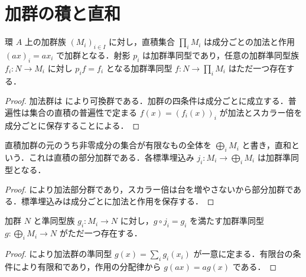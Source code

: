 \section{加群の積と直和}
\begin{prop}[加群の直積]
環 $A$ 上の加群族 $(M_i)_{i\in I}$ に対し，直積集合 $\prod_iM_i$ は成分ごとの加法と作用 $(ax)_i=ax_i$ で加群となる．射影 $p_i$ は加群準同型であり，任意の加群準同型族 $f_i:N\to M_i$ に対し $p_i f=f_i$ となる加群準同型 $f:N\to\prod_iM_i$ はただ一つ存在する．
\end{prop}
\begin{proof}
加法群は  により可換群である．加群の四条件は成分ごとに成立する．普遍性は集合の直積の普遍性で定まる $f(x)=(f_i(x))_i$ が加法とスカラー倍を成分ごとに保存することによる．
\end{proof}
\begin{defn}[加群の直和]
直積加群の元のうち非零成分の集合が有限なもの全体を $\bigoplus_iM_i$ と書き，直和という．これは直積の部分加群である．各標準埋込み $j_i:M_i\to\bigoplus_iM_i$ は加群準同型となる．
\end{defn}
\begin{proof}
 により加法部分群であり，スカラー倍は台を増やさないから部分加群である．標準埋込みは成分ごとに加法と作用を保存する．
\end{proof}
\begin{prop}[加群の直和の普遍性]
加群 $N$ と準同型族 $g_i:M_i\to N$ に対し，$g\circ j_i=g_i$ を満たす加群準同型 $g:\bigoplus_iM_i\to N$ がただ一つ存在する．
\end{prop}
\begin{proof}
 により加法群の準同型 $g(x)=\sum_i g_i(x_i)$ が一意に定まる．有限台の条件により有限和であり，作用の分配律から $g(ax)=ag(x)$ である．
\end{proof}
